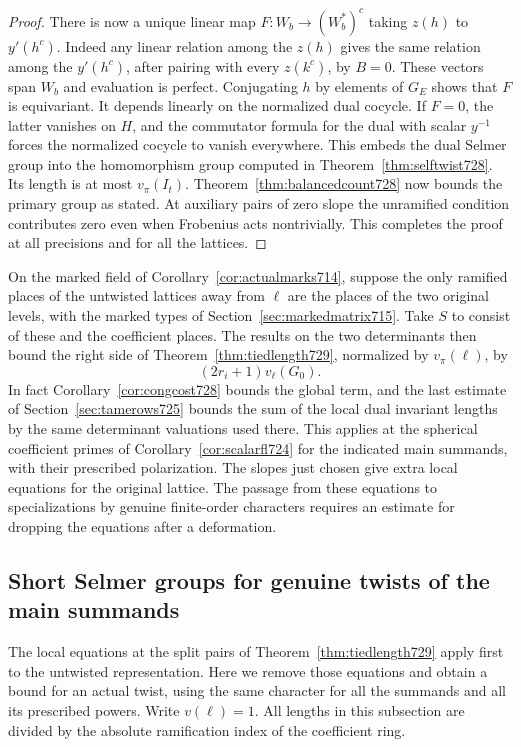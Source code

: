 \documentclass[a4paper,11pt]{article}
\theoremstyle{definition}
\theoremstyle{remark}
\numberwithin{equation}{section}
\begin{document}
\begin{proof}
There is now a unique linear map \(F:W_b\to(W_b^*)^c\) taking
\(z(h)\) to \(y'(h^c)\). Indeed any linear relation among the
\(z(h)\) gives the same relation among the \(y'(h^c)\), after pairing
with every \(z(k^c)\), by \(B=0\). These vectors span \(W_b\) and
evaluation is perfect. Conjugating \(h\) by elements of \(G_E\)
shows that \(F\) is equivariant. It depends linearly on the
normalized dual cocycle. If \(F=0\), the latter vanishes on \(H\),
and the commutator formula for the dual with scalar \(y^{-1}\)
forces the normalized cocycle to vanish everywhere. This embeds
the dual Selmer group into the homomorphism group computed in
Theorem~\ref{thm:selftwist728}. Its length is at most \(v_\pi(I_t)\).
Theorem~\ref{thm:balancedcount728} now bounds the primary group
as stated. At auxiliary pairs of zero slope the unramified condition
contributes zero even when Frobenius acts nontrivially. This completes
the proof at all precisions and for all the lattices.
\end{proof}

On the marked field of Corollary~\ref{cor:actualmarks714}, suppose
the only ramified places of the untwisted lattices away from \(\ell\)
are the places of the two original levels, with the marked types of
Section~\ref{sec:markedmatrix715}. Take \(S\) to consist of these and
the coefficient places. The results on the two determinants then
bound the right side of Theorem~\ref{thm:tiedlength729}, normalized
by \(v_\pi(\ell)\), by
\[
                (2r_i+1)v_\ell(G_0).
\]
In fact Corollary~\ref{cor:congcost728} bounds the global term, and
the last estimate of Section~\ref{sec:tamerows725} bounds the sum
of the local dual invariant lengths by the same determinant
valuations used there. This applies at the spherical coefficient
primes of Corollary~\ref{cor:scalarfl724} for the indicated main
summands, with their prescribed polarization. The slopes just chosen
give extra local equations for the original lattice. The passage from
these equations to specializations by genuine finite-order characters
requires an estimate for dropping the equations after a deformation.
\clearpage

\subsection{Short Selmer groups for genuine twists of the main summands}
\label{sec:smalltwisted730}

The local equations at the split pairs of
Theorem~\ref{thm:tiedlength729} apply first to the untwisted
representation. Here we remove those equations and obtain a bound for
an actual twist, using the same character for all the summands and all
its prescribed powers. Write \(v(\ell)=1\). All lengths in this
subsection are divided by the absolute ramification index of the
coefficient ring.
\end{document}
